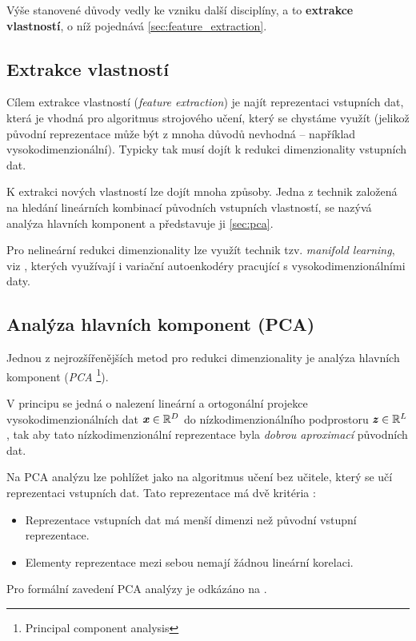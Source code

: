 Výše stanovené důvody vedly ke vzniku další disciplíny, a to \textbf{extrakce vlastností}, o níž pojednává \autoref{sec:feature_extraction}. 

\subsection{Extrakce vlastností}
\label{sec:feature_extraction}
Cílem extrakce vlastností (\emph{feature extraction}) je najít reprezentaci vstupních dat, která je vhodná pro algoritmus strojového učení, který se chystáme využít (jelikož původní reprezentace může být z mnoha důvodů nevhodná – například vysokodimenzionální).
Typicky tak musí dojít k redukci dimenzionality vstupních dat. \cite{Liu1998}

K extrakci nových vlastností lze dojít mnoha způsoby.
Jedna z technik založená na hledání lineárních kombinací původních vstupních vlastností, se nazývá analýza hlavních komponent a představuje ji \autoref{sec:pca}.

Pro nelineární redukci dimenzionality lze využít technik tzv. \emph{manifold learning}, viz \cite[kap. 5.11.3.]{Goodfellow2016}, kterých využívají i variační autoenkodéry pracující s vysokodimenzionálními daty.


\subsection{Analýza hlavních komponent (PCA)}
\label{sec:pca}
Jednou z nejrozšířenějších metod pro redukci dimenzionality je analýza hlavních komponent (\emph{PCA} \footnote{Principal component analysis}).

V principu se jedná o nalezení lineární a ortogonální projekce vysokodimenzionálních dat $\textbf{\emph{x}} \in \mathbb{R}^D$ do nízkodimenzionálního podprostoru  $\textbf{\emph{z}} \in \mathbb{R}^L$,
tak aby tato nízkodimenzionální reprezentace byla \emph{dobrou aproximací} původních dat.

Na PCA analýzu lze pohlížet jako na algoritmus učení bez učitele, který se učí reprezentaci vstupních dat. Tato reprezentace má dvě kritéria \cite{Goodfellow2016}:

\begin{itemize}
    \item Reprezentace vstupních dat má menší dimenzi než původní vstupní reprezentace.
    \item Elementy reprezentace mezi sebou nemají žádnou lineární korelaci.
\end{itemize}

Pro formální zavedení PCA analýzy je odkázáno na \cite{Murphy2022}.

